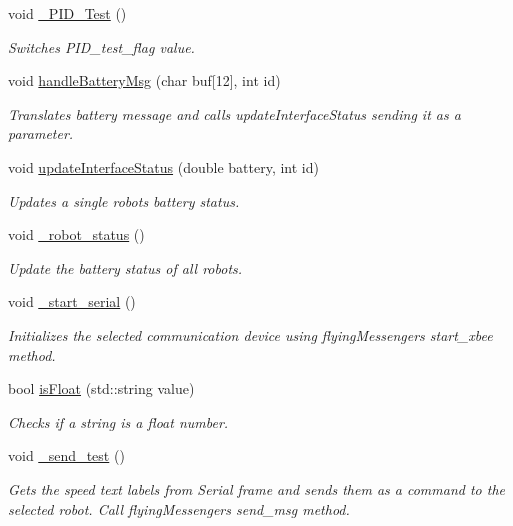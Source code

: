 \begin{DoxyCompactItemize}
void \hyperlink{class_control_g_u_i_a90dbd3d101fa49c6926e3cef452fb0a2}{\+\_\+\+P\+I\+D\+\_\+\+Test} ()
\begin{DoxyCompactList}\small\item\em Switches P\+I\+D\+\_\+test\+\_\+flag value. \end{DoxyCompactList}\item 
void \hyperlink{class_control_g_u_i_a87c4112af79ad3a26de882717621d226}{handle\+Battery\+Msg} (char buf\mbox{[}12\mbox{]}, int id)
\begin{DoxyCompactList}\small\item\em Translates battery message and calls update\+Interface\+Status sending it as a parameter. \end{DoxyCompactList}\item 
void \hyperlink{class_control_g_u_i_a79310d7b529eb07bbc67f7873964914f}{update\+Interface\+Status} (double battery, int id)
\begin{DoxyCompactList}\small\item\em Updates a single robot\textquotesingle{}s battery status. \end{DoxyCompactList}\item 
void \hyperlink{class_control_g_u_i_abe917aff974bd6ac9ce5193edc864814}{\+\_\+robot\+\_\+status} ()
\begin{DoxyCompactList}\small\item\em Update the battery status of all robots. \end{DoxyCompactList}\item 
void \hyperlink{class_control_g_u_i_ab56193e598145a8ad679029abaf0fd46}{\+\_\+start\+\_\+serial} ()
\begin{DoxyCompactList}\small\item\em Initializes the selected communication device using flying\+Messenger\textquotesingle{}s start\+\_\+xbee method. \end{DoxyCompactList}\item 
bool \hyperlink{class_control_g_u_i_ad2912b87e92a5db7125da7264c57cbde}{is\+Float} (std\+::string value)
\begin{DoxyCompactList}\small\item\em Checks if a string is a float number. \end{DoxyCompactList}\item 
void \hyperlink{class_control_g_u_i_a0838b5d3b0d6651b7a1a58928bc83327}{\+\_\+send\+\_\+test} ()
\begin{DoxyCompactList}\small\item\em Gets the speed text labels from \textquotesingle{}Serial\textquotesingle{} frame and sends them as a command to the selected robot. Call flying\+Messenger\textquotesingle{}s send\+\_\+msg method. \end{DoxyCompactList}\item 

\end{DoxyCompactItemize}
